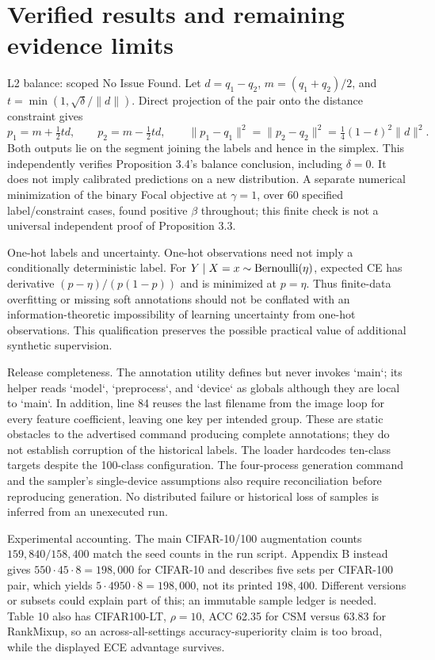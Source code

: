 \documentclass[10pt]{article}
\begin{document}
\section*{Verified results and remaining evidence limits}
L2 balance: scoped No Issue Found. Let \(d=q_1-q_2\), \(m=(q_1+q_2)/2\), and \(t=\min(1,\sqrt{\delta}/\|d\|)\). Direct projection of the pair onto the distance constraint gives \[p_1=m+\tfrac12td,\qquad p_2=m-\tfrac12td,\qquad
 \|p_1-q_1\|^2=\|p_2-q_2\|^2
 =\tfrac14(1-t)^2\|d\|^2.\] Both outputs lie on the segment joining the labels and hence in the simplex. This independently verifies Proposition 3.4’s balance conclusion, including \(\delta=0\). It does not imply calibrated predictions on a new distribution. A separate numerical minimization of the binary Focal objective at \(\gamma=1\), over 60 specified label/constraint cases, found positive \(\beta\) throughout; this finite check is not a universal independent proof of Proposition 3.3.\par
One-hot labels and uncertainty. One-hot observations need not imply a conditionally deterministic label. For \(Y\mid X=x\sim{\rm Bernoulli}(\eta)\), expected CE has derivative \((p-\eta)/(p(1-p))\) and is minimized at \(p=\eta\). Thus finite-data overfitting or missing soft annotations should not be conflated with an information-theoretic impossibility of learning uncertainty from one-hot observations. This qualification preserves the possible practical value of additional synthetic supervision.\par
Release completeness. The annotation utility defines but never invokes `main`; its helper reads `model`, `preprocess`, and `device` as globals although they are local to `main`. In addition, line 84 reuses the last filename from the image loop for every feature coefficient, leaving one key per intended group. These are static obstacles to the advertised command producing complete annotations; they do not establish corruption of the historical labels. The loader hardcodes ten-class targets despite the 100-class configuration. The four-process generation command and the sampler’s single-device assumptions also require reconciliation before reproducing generation. No distributed failure or historical loss of samples is inferred from an unexecuted run.\par
Experimental accounting. The main CIFAR-10/100 augmentation counts \(159{,}840/158{,}400\) match the seed counts in the run script. Appendix B instead gives \(550\cdot45\cdot8=198{,}000\) for CIFAR-10 and describes five sets per CIFAR-100 pair, which yields \(5\cdot4950\cdot8=198{,}000\), not its printed \(198{,}400\). Different versions or subsets could explain part of this; an immutable sample ledger is needed. Table 10 also has CIFAR100-LT, \(\rho=10\), ACC 62.35 for CSM versus 63.83 for RankMixup, so an across-all-settings accuracy-superiority claim is too broad, while the displayed ECE advantage survives.\par
\end{document}
